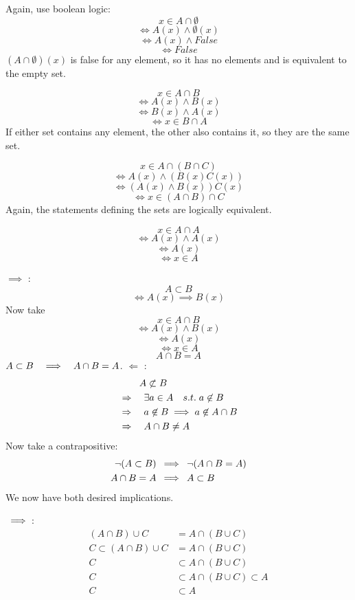 \documentclass{article}
\DeclarePairedDelimiter\prn{(}{)}
\newcommand{\nl}[0]{\newline}
\newcommand{\rimp}[1][5]{\kern#1px \Longrightarrow \kern#1px}
\newcommand{\cimp}[1][5]{\kern#1px \iff \kern#1px}
\begin{document}
\begin{flushleft}
 \nl
Again, use boolean logic:
$$x \in A \cap \emptyset$$
$$\Leftrightarrow A(x) \wedge \emptyset(x)$$
$$\Leftrightarrow A(x) \wedge False$$
$$\Leftrightarrow False$$
$(A \cap \emptyset)(x)$ is false for any element, so it has no elements and is equivalent to the empty set. \nl

 \nl
$$x \in A \cap B$$
$$\Leftrightarrow A(x) \wedge B(x)$$
$$\Leftrightarrow B(x) \wedge A(x)$$
$$\Leftrightarrow x \in B \cap A$$
If either set contains any element, the other also contains it, so they are the same set. \nl

 \nl
$$ x \in A \cap (B \cap C)$$
$$ \Leftrightarrow A(x) \wedge (B(x) C(x))$$
$$\Leftrightarrow (A(x) \wedge B(x)) C(x)$$
$$\Leftrightarrow x \in (A \cap B) \cap C$$
Again, the statements defining the sets are logically equivalent. \nl

 \nl
$$ x \in A \cap A$$
$$\Leftrightarrow A(x) \wedge A(x)$$
$$\Leftrightarrow A(x)$$
$$\Leftrightarrow x \in A$$

\fbox{$A \subset B \cimp A \cap B = A$} \nl
$\implies$ :
$$A \subset B$$
$$\Leftrightarrow A(x) \implies B(x)$$
Now take
$$x \in A \cap B$$
$$\Leftrightarrow A(x) \wedge B(x)$$
$$\Leftrightarrow A(x)$$
$$\Leftrightarrow x \in A$$
$$A \cap B = A$$
$A \subset B \rimp[10] A \cap B = A$. \nl
$\Longleftarrow$ : \nl
$$\begin{aligned}
& \phantom{20px} A \not\subset B \\
&\Rightarrow\kern10px\exists a \in A \kern10px s.t.\; a \not\in B \\
&\Rightarrow\kern10px a \not\in B \implies a\not\in A \cap B \\
&\Rightarrow\kern10px A \cap B \neq A \\
\end{aligned}$$ \nl
Now take a contrapositive: \nl
$$\begin{aligned}
\neg (A \subset B) &\rimp \neg (A \cap B = A) \\
A \cap B = A &\rimp A \subset B \\
\end{aligned}$$
We now have both desired implications. \nl

\fbox{$\prn*{A \cap B} \cup C = A \cap \prn*{B \cup C} \cimp[10] C \subset A$} \nl
$\rimp$: \nl
$$\begin{aligned}
(A \cap B) \cup C &= A \cap (B \cup C)\\
C \subset (A \cap B) \cup C &= A \cap (B \cup C)\\
C &\subset A \cap (B \cup C)\\
C &\subset A \cap (B \cup C) \subset A  \\
C &\subset A\\
\end{aligned}$$


\end{flushleft}
\end{document}
